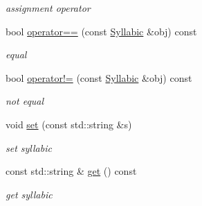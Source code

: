 \begin{DoxyCompactItemize}
\begin{DoxyCompactList}\small\item\em assignment operator \end{DoxyCompactList}\item 
\hypertarget{classsinsy_1_1Syllabic_a869e1923c8dd9a52449c85e8b462d610}{bool \hyperlink{classsinsy_1_1Syllabic_a869e1923c8dd9a52449c85e8b462d610}{operator==} (const \hyperlink{classsinsy_1_1Syllabic}{\-Syllabic} \&obj) const }\label{classsinsy_1_1Syllabic_a869e1923c8dd9a52449c85e8b462d610}

\begin{DoxyCompactList}\small\item\em equal \end{DoxyCompactList}\item 
\hypertarget{classsinsy_1_1Syllabic_a9b4292492ae66154915562a217c2a301}{bool \hyperlink{classsinsy_1_1Syllabic_a9b4292492ae66154915562a217c2a301}{operator!=} (const \hyperlink{classsinsy_1_1Syllabic}{\-Syllabic} \&obj) const }\label{classsinsy_1_1Syllabic_a9b4292492ae66154915562a217c2a301}

\begin{DoxyCompactList}\small\item\em not equal \end{DoxyCompactList}\item 
void \hyperlink{classsinsy_1_1Syllabic_a35c59408a52e112e2529dc0c93e5fc12}{set} (const std\-::string \&s)
\begin{DoxyCompactList}\small\item\em set syllabic \end{DoxyCompactList}\item 
\hypertarget{classsinsy_1_1Syllabic_acc3876365a65187fe088a7f675b08c17}{const std\-::string \& \hyperlink{classsinsy_1_1Syllabic_acc3876365a65187fe088a7f675b08c17}{get} () const }\label{classsinsy_1_1Syllabic_acc3876365a65187fe088a7f675b08c17}

\begin{DoxyCompactList}\small\item\em get syllabic \end{DoxyCompactList}\end{DoxyCompactItemize}
